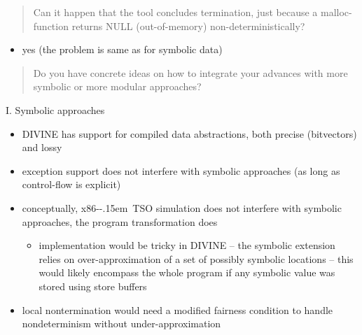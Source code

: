 \documentclass[aspectratio=169, fi]{paradise-slide}
\newcommand{\xtso}{\mbox{x86-\kern-.15em TSO}\xspace}
\newcommand{\rquote}[1]{\begin{quote}#1\end{quote}\bigskip\setlength{\leftmargini}{1em}}
\begin{document}
\begin{frame}[noframenumbering]{\qtitle}
  \rquote{Can it happen that the tool concludes termination, just because a malloc-function returns
    NULL (out-of-memory) non-deterministically?}
  \begin{itemize}
    \item yes (the problem is same as for symbolic data)
  \end{itemize}
\end{frame}

\begin{frame}[noframenumbering]{\qtitle}
  \rquote{Do you have concrete ideas on how to integrate your advances with more symbolic or more
    modular approaches?}

  \textrm{I.} Symbolic approaches
  \begin{itemize}
    \item DIVINE has support for compiled data abstractions, both precise (bitvectors) and lossy
      \pause
    \item exception support does not interfere with symbolic approaches (as long as control-flow is
      explicit)
      \pause
    \item conceptually, \xtso simulation does not interfere with symbolic approaches, the program
      transformation does
      \begin{itemize}
        \item implementation would be tricky in DIVINE
          – the symbolic extension relies on over-approximation of a set of possibly symbolic
          locations – this would likely encompass the whole program if any symbolic value was stored
          using store buffers
      \end{itemize}
      \pause
    \item local nontermination would need a modified fairness condition to handle nondeterminism
      without under-approximation
  \end{itemize}
\end{frame}
\end{document}
